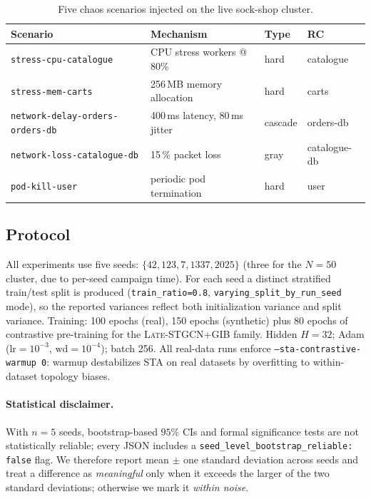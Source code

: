 \documentclass[11pt,a4paper]{article}
\newcommand{\STA}{\textsc{STA}}
\newcommand{\Late}{\textsc{Late-STGCN+GIB}}
\begin{document}
\begin{table}[t]
\centering\small
\begin{tabularx}{\linewidth}{lXll}
\toprule
\textbf{Scenario} & \textbf{Mechanism} & \textbf{Type} & \textbf{RC} \\
\midrule
\texttt{stress-cpu-catalogue}        & CPU stress workers @ 80\% & hard & catalogue \\
\texttt{stress-mem-carts}            & 256\,MB memory allocation & hard & carts \\
\texttt{network-delay-orders-orders-db} & 400\,ms latency, 80\,ms jitter & cascade & orders-db \\
\texttt{network-loss-catalogue-db}   & 15\,\% packet loss & gray & catalogue-db \\
\texttt{pod-kill-user}               & periodic pod termination & hard & user \\
\bottomrule
\end{tabularx}
\caption{Five chaos scenarios injected on the live sock-shop cluster.}
\label{tab:scenarios}
\end{table}

\subsection{Protocol}

All experiments use five seeds: $\{42, 123, 7, 1337, 2025\}$ (three for the
$N{=}50$ cluster, due to per-seed campaign time). For each seed a distinct
stratified train/test split is produced (\texttt{train\_ratio=0.8},
\texttt{varying\_split\_by\_run\_seed} mode), so the reported variances
reflect both initialization variance and split variance. Training:
100 epochs (real), 150 epochs (synthetic) plus 80 epochs of contrastive
pre-training for the \Late{} family. Hidden $H{=}32$; Adam
($\text{lr}{=}10^{-3}$, $\text{wd}{=}10^{-4}$); batch 256. All real-data runs
enforce \texttt{--sta-contrastive-warmup 0}: warmup destabilizes \STA{} on
real datasets by overfitting to within-dataset topology biases.

\paragraph{Statistical disclaimer.} With $n{=}5$ seeds, bootstrap-based
$95\%$ CIs and formal significance tests are not statistically reliable;
every JSON includes a \texttt{seed\_level\_bootstrap\_reliable: false} flag.
We therefore report mean $\pm$ one standard deviation across seeds and treat
a difference as \emph{meaningful} only when it exceeds the larger of the two
standard deviations; otherwise we mark it \emph{within noise}.
\end{document}
